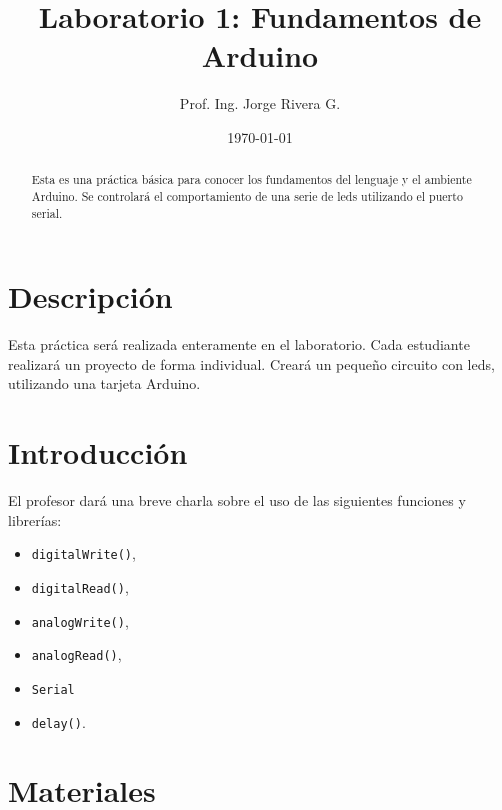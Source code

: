 \documentclass[12pt,letterpaper]{IEEEtran}
\title{Laboratorio 1: Fundamentos de Arduino}
\author{Prof. Ing. Jorge Rivera G.}
\date{\today}
\begin{document}

\renewcommand{\leftmark}{UNIVERSIDAD LATINA DE COSTA RICA -- BINGE-61 MICROCONTROLADORES}

\maketitle


\begin{abstract}
Esta es una práctica básica para conocer los fundamentos del lenguaje y el ambiente Arduino. Se controlará el comportamiento de una serie de leds utilizando el puerto serial.
\end{abstract}
\section{Descripción}

Esta práctica será realizada enteramente en el laboratorio. Cada estudiante realizará un proyecto de forma individual. Creará un pequeño circuito con leds, utilizando una tarjeta Arduino.




\section{Introducción}

El profesor dará una breve charla sobre el uso de las siguientes funciones y librerías:
\begin{itemize}
\item  \texttt{digitalWrite()},
\item  \texttt{digitalRead()},
\item  \texttt{analogWrite()},
\item  \texttt{analogRead()},
\item  \texttt{Serial}
\item  \texttt{delay()}.

\end{itemize}
\section{Materiales}
\end{document}
